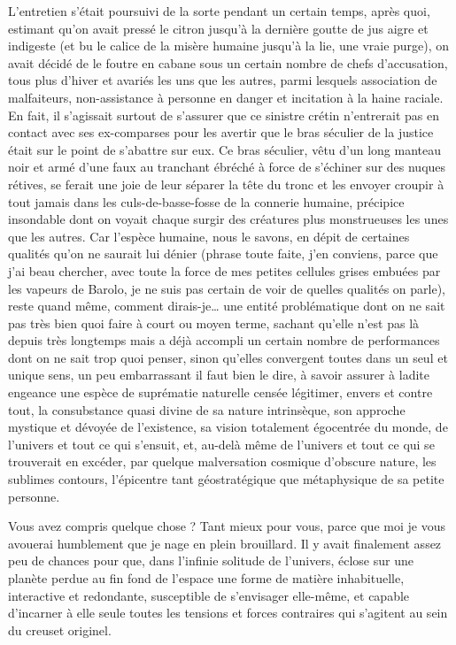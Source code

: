 L’entretien s’était poursuivi de la sorte pendant un certain temps, après quoi, estimant qu’on avait pressé le citron jusqu’à la dernière goutte de jus aigre et indigeste (et bu le calice de la misère humaine jusqu’à la lie, une vraie purge), on avait décidé de le foutre en cabane sous un certain nombre de chefs d’accusation, tous plus d’hiver et avariés les uns que les autres, parmi lesquels association de malfaiteurs, non-assistance à personne en danger et incitation à la haine raciale. En fait, il s’agissait surtout de s’assurer que ce sinistre crétin n’entrerait pas en contact avec ses ex-comparses pour les avertir que le bras séculier de la justice était sur le point de s’abattre sur eux. Ce bras séculier, vêtu d’un long manteau noir et armé d’une faux au tranchant ébréché à force de s’échiner sur des nuques rétives, se ferait une joie de leur séparer la tête du tronc et les envoyer croupir à tout jamais dans les culs-de-basse-fosse de la connerie humaine, précipice insondable dont on voyait chaque surgir des créatures plus monstrueuses les unes que les autres. Car l’espèce humaine, nous le savons, en dépit de certaines qualités qu’on ne saurait lui dénier (phrase toute faite, j’en conviens, parce que j’ai beau chercher, avec toute la force de mes petites cellules grises embuées par les vapeurs de Barolo, je ne suis pas certain de voir de quelles qualités on parle), reste quand même, comment dirais-je… une entité problématique dont on ne sait pas très bien quoi faire à court ou moyen terme, sachant qu’elle n’est pas là depuis très longtemps mais a déjà accompli un certain nombre de performances dont on ne sait trop quoi penser, sinon qu’elles convergent toutes dans un seul et unique sens, un peu embarrassant il faut bien le dire, à savoir assurer à ladite engeance une espèce de suprématie naturelle censée légitimer, envers et contre tout, la consubstance quasi divine de sa nature intrinsèque, son approche mystique et dévoyée de l’existence, sa vision totalement égocentrée du monde, de l’univers et tout ce qui s’ensuit, et, au-delà même de l’univers et tout ce qui se trouverait en excéder, par quelque malversation cosmique d’obscure nature, les sublimes contours, l’épicentre tant géostratégique que métaphysique de sa petite personne.

Vous avez compris quelque chose ? Tant mieux pour vous, parce que moi je vous avouerai humblement que je nage en plein brouillard. Il y avait finalement assez peu de chances pour que, dans l’infinie solitude de l’univers, éclose sur une planète perdue au fin fond de l’espace une forme de matière inhabituelle, interactive et redondante, susceptible de s’envisager elle-même, et capable d’incarner à elle seule toutes les tensions et forces contraires qui s’agitent au sein du creuset originel.


